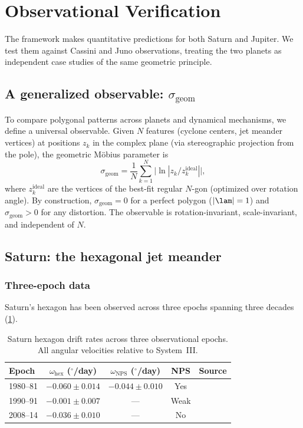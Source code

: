\section{Observational Verification}
\label{sec:verification}

The framework makes quantitative predictions for both Saturn and Jupiter.
We test them against Cassini and Juno observations, treating the two
planets as independent case studies of the same geometric principle.

\subsection{A generalized observable: \texorpdfstring{$\sigma_{\mathrm{geom}}$}{sigma-geom}}
\label{sec:sigma-geom}

To compare polygonal patterns across planets and dynamical mechanisms,
we define a universal observable.  Given $N$ features (cyclone centers,
jet meander vertices) at positions $z_k$ in the complex plane (via
stereographic projection from the pole), the geometric M\"obius parameter
is
\begin{equation}\label{eq:sigma-geom}
  \sigma_{\mathrm{geom}} = \frac{1}{N}\sum_{k=1}^{N}
  \bigl|\!\ln|z_k / z_k^{\mathrm{ideal}}|\bigr|,
\end{equation}
where $z_k^{\mathrm{ideal}}$ are the vertices of the best-fit regular
$N$-gon (optimized over rotation angle).  By construction,
$\sigma_{\mathrm{geom}} = 0$ for a perfect polygon ($|\lam| = 1$) and
$\sigma_{\mathrm{geom}} > 0$ for any distortion.  The observable is
rotation-invariant, scale-invariant, and independent of $N$.

\subsection{Saturn: the hexagonal jet meander}

\subsubsection{Three-epoch data}

Saturn's hexagon has been observed across three epochs spanning
three decades (\cref{tab:epochs}).

\begin{table}[htbp]
\centering
\caption{Saturn hexagon drift rates across three observational epochs.
All angular velocities relative to System~III.}
\label{tab:epochs}
\begin{tabular}{lcccl}
\toprule
Epoch & $\omega_{\mathrm{hex}}$ ($^\circ$/day) & $\omega_{\mathrm{NPS}}$ ($^\circ$/day) & NPS & Source \\
\midrule
1980--81  & $-0.060 \pm 0.014$ & $-0.044 \pm 0.010$ & Yes   & \citet{Godfrey1988} \\
1990--91  & $-0.001 \pm 0.007$ & ---                  & Weak  & \citet{SanchezLavega1993} \\
2008--14  & $-0.036 \pm 0.010$ & ---                  & No    & \citet{SanchezLavega2014} \\
\bottomrule
\end{tabular}
\end{table}


